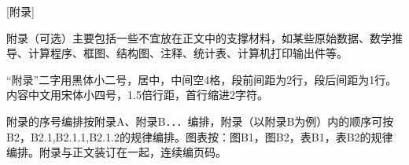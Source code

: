 %

[附录]

附录（可选）主要包括一些不宜放在正文中的支撑材料，如某些原始数据、数学推导、计算程序、框图、结构图、注释、统计表、计算机打印输出件等。

“附录”二字用黑体小二号，居中，中间空4格，段前间距为2行，段后间距为1行。内容中文用宋体小四号，1.5倍行距，首行缩进2字符。

附录的序号编排按附录A、附录B．．．编排，附录（以附录B为例）内的顺序可按B2，B2.1,B2.1.1,B2.1.2的规律编排。图表按：图B1，图B2，表B1，表B2的规律编排。附录与正文装订在一起，连续编页码。


